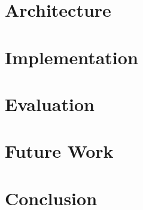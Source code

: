 \documentclass[letterpaper,twocolumn,10pt,draft]{article}
\begin{document}
\section{\label{sec:arch}Architecture}

\section{\label{sec:impl}Implementation}

\section{\label{sec:eval}Evaluation}

\section{\label{sec:fw}Future Work}

\section{\label{sec:con}Conclusion}

%
%
%
%
%

{\footnotesize
    
    }
\end{document}
